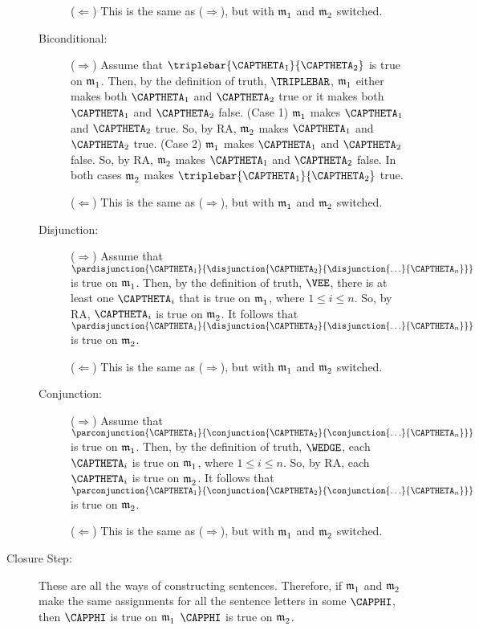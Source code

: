 \begin{PROOF}
\begin{description}
\begin{description}
			($\Leftarrow$) This is the same as ($\Rightarrow$), but with $\mathfrak{m^{\mathrm{}}_{\mathrm{1}}}$ and $\mathfrak{m^{\mathrm{}}_{\mathrm{2}}}$ switched.
			
			\item[Biconditional:] ($\Rightarrow$) Assume that $\triplebar{\CAPTHETA_1}{\CAPTHETA_2}$ is true on $\mathfrak{m^{\mathrm{}}_{\mathrm{1}}}$.
			Then, by the definition of truth, $\TRIPLEBAR$, $\mathfrak{m^{\mathrm{}}_{\mathrm{1}}}$ either makes both $\CAPTHETA_1$ and $\CAPTHETA_2$ true or it makes both $\CAPTHETA_1$ and $\CAPTHETA_2$ false.
			(Case 1) $\mathfrak{m^{\mathrm{}}_{\mathrm{1}}}$ makes $\CAPTHETA_1$ and $\CAPTHETA_2$ true.
			So, by RA, $\mathfrak{m^{\mathrm{}}_{\mathrm{2}}}$ makes $\CAPTHETA_1$ and $\CAPTHETA_2$ true.
			(Case 2) $\mathfrak{m^{\mathrm{}}_{\mathrm{1}}}$ makes $\CAPTHETA_1$ and $\CAPTHETA_2$ false.
			So, by RA, $\mathfrak{m^{\mathrm{}}_{\mathrm{2}}}$ makes $\CAPTHETA_1$ and $\CAPTHETA_2$ false.
			In both cases $\mathfrak{m^{\mathrm{}}_{\mathrm{2}}}$ makes $\triplebar{\CAPTHETA_1}{\CAPTHETA_2}$ true.

    		($\Leftarrow$) This is the same as ($\Rightarrow$), but with $\mathfrak{m^{\mathrm{}}_{\mathrm{1}}}$ and $\mathfrak{m^{\mathrm{}}_{\mathrm{2}}}$ switched.

			\item[Disjunction:] ($\Rightarrow$) Assume that $\pardisjunction{\CAPTHETA_1}{\disjunction{\CAPTHETA_2}{\disjunction{\ldots}{\CAPTHETA_{\integer{n}}}}}$ is true on $\mathfrak{m^{\mathrm{}}_{\mathrm{1}}}$.
			Then, by the definition of truth, $\VEE$, there is at least one $\CAPTHETA_i$ that is true on $\mathfrak{m^{\mathrm{}}_{\mathrm{1}}}$, where $1\leq i\leq n$.
			So, by RA, $\CAPTHETA_i$ is true on $\mathfrak{m^{\mathrm{}}_{\mathrm{2}}}$.
			It follows that $\pardisjunction{\CAPTHETA_1}{\disjunction{\CAPTHETA_2}{\disjunction{\ldots}{\CAPTHETA_{\integer{n}}}}}$ is true on $\mathfrak{m^{\mathrm{}}_{\mathrm{2}}}$.

			($\Leftarrow$) This is the same as ($\Rightarrow$), but with $\mathfrak{m^{\mathrm{}}_{\mathrm{1}}}$ and $\mathfrak{m^{\mathrm{}}_{\mathrm{2}}}$ switched.

			\item[Conjunction:] ($\Rightarrow$) Assume that $\parconjunction{\CAPTHETA_1}{\conjunction{\CAPTHETA_2}{\conjunction{\ldots}{\CAPTHETA_{\integer{n}}}}}$ is true on $\mathfrak{m^{\mathrm{}}_{\mathrm{1}}}$.
			Then, by the definition of truth, $\WEDGE$, each $\CAPTHETA_i$ is true on $\mathfrak{m^{\mathrm{}}_{\mathrm{1}}}$, where $1\leq i\leq n$.
			So, by RA, each $\CAPTHETA_i$ is true on $\mathfrak{m^{\mathrm{}}_{\mathrm{2}}}$.
			It follows that $\parconjunction{\CAPTHETA_1}{\conjunction{\CAPTHETA_2}{\conjunction{\ldots}{\CAPTHETA_{\integer{n}}}}}$ is true on $\mathfrak{m^{\mathrm{}}_{\mathrm{2}}}$.

			($\Leftarrow$) This is the same as ($\Rightarrow$), but with $\mathfrak{m^{\mathrm{}}_{\mathrm{1}}}$ and $\mathfrak{m^{\mathrm{}}_{\mathrm{2}}}$ switched.

		\end{description}
		\item[Closure Step:] These are all the ways of constructing \GSL{} sentences. Therefore, if $\mathfrak{m^{\mathrm{}}_{\mathrm{1}}}$ and $\mathfrak{m^{\mathrm{}}_{\mathrm{2}}}$ make the same assignments for all the sentence letters in some $\CAPPHI$, then $\CAPPHI$ is true on $\mathfrak{m^{\mathrm{}}_{\mathrm{1}}}$ \Iff $\CAPPHI$ is true on $\mathfrak{m^{\mathrm{}}_{\mathrm{2}}}$.
	\end{description}
\end{PROOF}


